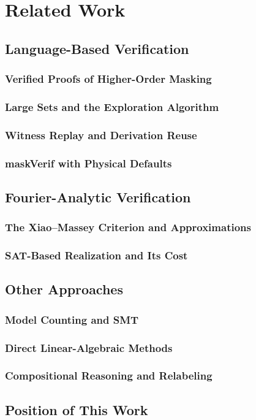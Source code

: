 \chapter{Related Work}
\section{Language-Based Verification} %
  \subsection{Verified Proofs of Higher-Order Masking}
  \subsection{Large Sets and the Exploration Algorithm}
  \subsection{Witness Replay and Derivation Reuse}
  \subsection{maskVerif with Physical Defaults}
\section{Fourier-Analytic Verification} %
  \subsection{The Xiao--Massey Criterion and Approximations}
  \subsection{SAT-Based Realization and Its Cost}
\section{Other Approaches}
  \subsection{Model Counting and SMT}
  \subsection{Direct Linear-Algebraic Methods}
  \subsection{Compositional Reasoning and Relabeling}
\section{Position of This Work}
